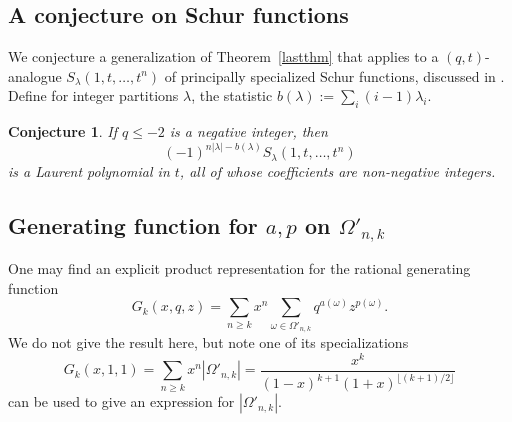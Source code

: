 \documentclass[10pt]{amsart}
\theoremstyle{plain}
\newtheorem{conjecture}[theorem]{Conjecture}
\theoremstyle{definition}
\theoremstyle{remark}
\numberwithin{equation}{section}
\begin{document}
\subsection{A conjecture on Schur functions}

We conjecture a generalization of Theorem~\ref{lastthm} that applies
to a $(q,t)$-analogue $S_\lambda(1,t,\ldots,t^n)$
of principally specialized Schur functions, discussed
in \cite[Definition 5.1]{RS}.  Define for
integer partitions $\lambda$, the statistic
$b(\lambda):= \sum_{i} (i-1)\lambda_i.$

\begin{conjecture}
\label{conj}
If $q\le -2$ is a negative integer, then
$$
(-1)^{n|\lambda|-b(\lambda)}S_{\lambda}(1,t,\ldots,t^n)
$$
is a Laurent polynomial in $t$,
all of whose coefficients are non-negative integers.
\end{conjecture}


\subsection{Generating function for $a,p$ on $\Omega'_{n,k}$}
One may find an explicit product representation for the rational 
generating function
$$
G_k(x,q,z)=\sum_{n\ge k}x^n \sum_{\omega\in \Omega'_{n,k}} 
q^{a(\omega)} z^{p(\omega)}.
$$
We do not give the result here, but note one of its specializations
$$
G_k(x,1,1)=\sum_{n\ge k}x^n  |\Omega'_{n,k}|=
\frac{x^k}{(1-x)^{k+1}(1+x)^{\lfloor(k+1)/2\rfloor}}
$$
can be used to give an expression for  $|\Omega'_{n,k}|$.
\end{document}

